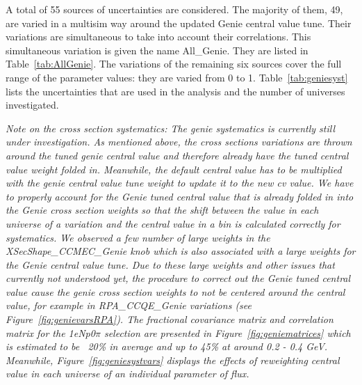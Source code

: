 \documentclass[a4paper]{article}
\begin{document}
A total of 55 sources of uncertainties are considered. The majority of them, 49, are varied in a multisim way around the updated Genie central value tune. Their variations are simultaneous to take into account their correlations. This simultaneous variation is given the name All\_Genie. They are listed in Table~\ref{tab:AllGenie}. The variations of the remaining six sources cover the full range of the parameter values: they are varied from 0 to 1. Table~\ref{tab:geniesyst} lists the uncertainties that are used in the analysis and the number of universes investigated.

\textit{Note on the cross section systematics: The genie systematics is currently still under investigation. 
As mentioned above, the cross sections variations are thrown around the tuned genie central value and therefore already have the tuned central value weight folded in. 
Meanwhile, the default central value has to be multiplied with the genie central value tune weight to update it to the new cv value. 
We have to properly account for the Genie tuned central value that is already folded in into the Genie cross section weights so that the shift between the value in each universe of a variation and 
the central value in a bin is calculated correctly for systematics.
We observed a few number of large weights in the XSecShape\_CCMEC\_Genie knob which is also associated with a large weights for the Genie central value tune. Due to these large weights and other issues that currently not understood yet, the procedure to correct out the Genie tuned central value cause the genie cross section weights to not be centered around the central value, for example in RPA\_CCQE\_Genie variations (see Figure~\ref{fig:genievarsRPA}).
The fractional covariance matrix and correlation matrix for the 1eNp0$\pi$ selection are presented in Figure~\ref{fig:geniematrices} which is estimated to be ~20\% in average and up to 45\% at around 0.2 - 0.4 GeV. Meanwhile, Figure~\ref{fig:geniesystvars} displays the effects of reweighting central value in each universe of an individual parameter of flux.}
\end{document}

